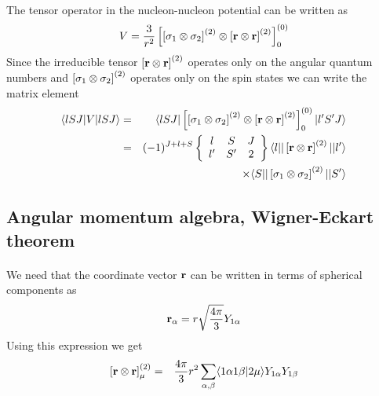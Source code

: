 \documentclass[%
twoside,                 %
final,                   %
10pt]{article}
\begin{document}
\paragraph{}
The tensor operator in 
the nucleon-nucleon potential can be written as  
\[
V=\frac{3}{r^{2}}\left[ \left[ {\bf \sigma}_1 \otimes {\bf \sigma}_2\right]^
{(2)} \otimes\left[{\bf r} \otimes {\bf r} \right]^{(2)}\right]^{(0)}_0
\]
Since the irreducible tensor  
$\left[{\bf r} \otimes {\bf r} \right]^{(2)}$
operates  only on the angular quantum numbers and
$\left[{\bf \sigma}_1 \otimes {\bf \sigma}_2\right]^{(2)}$ 
operates  only on 
the spin states we can write the matrix element 
\begin{eqnarray*}
\langle lSJ\vert V\vert lSJ\rangle & = &
\langle lSJ \vert\left[ \left[{\bf \sigma}_1 \otimes {\bf \sigma}_2\right]^{(2)} \otimes
\left[{\bf r} \otimes {\bf r} \right]^{(2)}\right]^{(0)}_0\vert l'S'J\rangle \\
&  = &
(-1)^{J+l+S}
\left\{\begin{array}{ccc} l&S&J \\ l'&S'&2\end{array}\right\}
\langle l \vert\vert\left[{\bf r} \otimes {\bf r} \right]^{(2)} \vert \vert l'\rangle\\
& &
\times \langle S\vert\vert\left[{\bf \sigma}_1 \otimes {\bf \sigma}_2\right]^{(2)} \vert\vert S'\rangle
\end{eqnarray*}



\subsection*{Angular momentum algebra, Wigner-Eckart theorem}

\paragraph{}
We need that
the coordinate vector ${\bf r}$ can be written in terms of spherical 
components as 
\[
{\bf r}_\alpha = r\sqrt{\frac{4\pi}{3}} Y_{1\alpha}
\]
Using this expression we get 
\begin{eqnarray*}
\left[{\bf r} \otimes {\bf r} \right]^{(2)}_\mu &=& \frac{4\pi}{3}r^2
\sum_{\alpha ,\beta}\langle 1\alpha 1\beta\vert 2\mu \rangle Y_{1\alpha} Y_{1\beta}
\end{eqnarray*}
\end{document}
